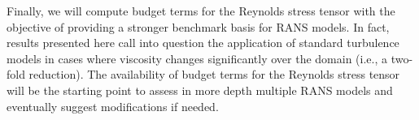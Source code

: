 \documentclass[twocolumn,10pt]{asme2e}
\begin{document}
Finally, we will compute budget terms for the Reynolds stress tensor with the objective of providing a stronger benchmark basis for RANS models.  In fact, results presented here call into question the application of standard turbulence models in cases where viscosity changes significantly over the domain (i.e., a two-fold reduction). The availability of budget terms for the Reynolds stress tensor will be the starting point to assess in more depth multiple RANS models and eventually suggest modifications if needed.




\appendix
\end{document}
